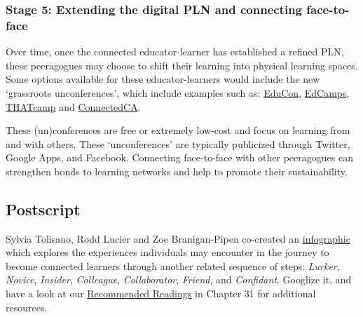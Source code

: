 \subsubsection{Stage 5: Extending the digital PLN and connecting
face-to-face}\label{stage-5-extending-the-digital-pln-and-connecting-face-to-face}

Over time, once the connected educator-learner has established a refined
PLN, these peeragogues may choose to shift their learning into physical
learning spaces. Some options available for these educator-learners
would include the new `grassroots unconferences', which include examples
such as: \href{http://educonphilly.org/}{EduCon},
\href{http://davidwees.com/content/what-edcamp}{EdCamps},
\href{http://thatcamp.org/}{THATcamp} and
\href{http://connectedcanada.org/}{ConnectedCA}.

These (un)conferences are free or extremely low-cost and focus on
learning from and with others. These `unconferences' are typically
publicized through Twitter, Google Apps, and Facebook. Connecting
face-to-face with other peeragogues can strengthen bonds to learning
networks and help to promote their sustainability.

\subsection{Postscript}\label{postscript}

Sylvia Tolisano, Rodd Lucier and Zoe Branigan-Pipen co-created an
\href{http://farm9.staticflickr.com/8160/7161689001_9b6725a4ca_h.jpg}{infographic}
which explores the experiences individuals may encounter in the journey
to become connected learners through another related sequence of steps:
\emph{Lurker}, \emph{Novice}, \emph{Insider}, \emph{Colleague},
\emph{Collaborator}, \emph{Friend}, and \emph{Confidant}. Googlize it,
and have a look at our
\href{http://peeragogy.org/recommended-reading/}{Recommended Readings}
in Chapter 31 for additional resources.
